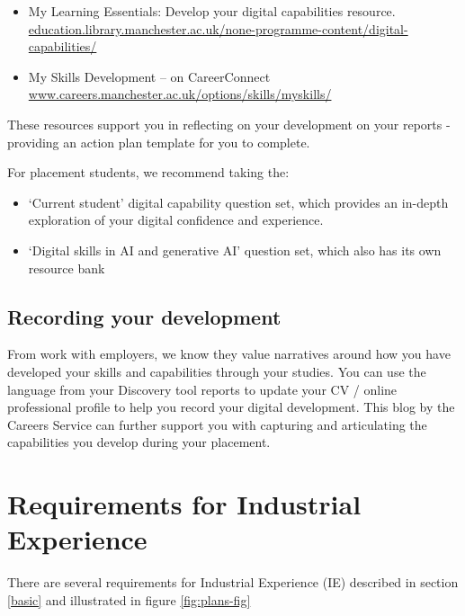 \documentclass[
]{book}
\providecommand{\tightlist}{%
  \setlength{\itemsep}{0pt}\setlength{\parskip}{0pt}}
\begin{document}
\begin{itemize}
\tightlist
\item
  My Learning Essentials: Develop your digital capabilities resource. \href{https://www.education.library.manchester.ac.uk/none-programme-content/digital-capabilities/}{education.library.manchester.ac.uk/none-programme-content/digital-capabilities/}
\item
  My Skills Development -- on CareerConnect \href{https://www.careers.manchester.ac.uk/options/skills/myskills/}{www.careers.manchester.ac.uk/options/skills/myskills/} \citep{audit}
\end{itemize}

These resources support you in reflecting on your development on your reports - providing an action plan template for you to complete.

For placement students, we recommend taking the:

\begin{itemize}
\tightlist
\item
  `Current student' digital capability question set, which provides an in-depth exploration of your digital confidence and experience.
\item
  `Digital skills in AI and generative AI' question set, which also has its own resource bank
\end{itemize}

\section{Recording your development}\label{development}

From work with employers, we know they value narratives around how you have developed your skills and capabilities through your studies. You can use the language from your Discovery tool reports to update your CV / online professional profile to help you record your digital development. This blog by the Careers Service can further support you with capturing and articulating the capabilities you develop during your placement. \citep{conway}

\chapter{Requirements for Industrial Experience}\label{requirements}

There are several requirements for Industrial Experience (IE) described in section \ref{basic} and illustrated in figure \ref{fig:plans-fig}
\end{document}
